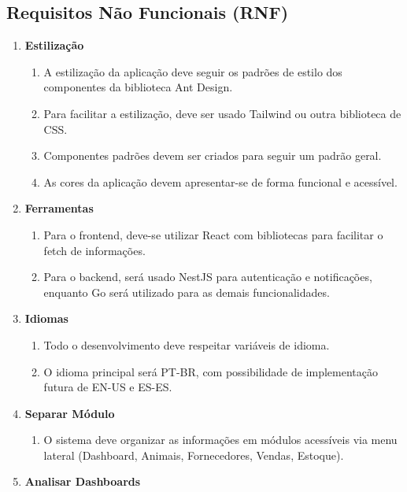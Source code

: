 \documentclass[12pt, a4paper]{article}
\begin{document}
\begin{spacing}{1.5}
\subsection{Requisitos Não Funcionais (RNF)}
\begin{spacing}{1.5}
\begin{enumerate}[label=RNF0\arabic{*}.]
    \item \textbf{Estilização}
    \begin{enumerate}[label=RNF01.0\arabic{*}]
        \item A estilização da aplicação deve seguir os padrões de estilo dos componentes da biblioteca Ant Design.
        \item Para facilitar a estilização, deve ser usado Tailwind ou outra biblioteca de CSS.
        \item Componentes padrões devem ser criados para seguir um padrão geral.
        \item As cores da aplicação devem apresentar-se de forma funcional e acessível.
    \end{enumerate}
    \item \textbf{Ferramentas}
    \begin{enumerate}[label=RNF02.0\arabic{*}]
        \item Para o frontend, deve-se utilizar React com bibliotecas para facilitar o fetch de informações.
        \item Para o backend, será usado NestJS para autenticação e notificações, enquanto Go será utilizado para as demais funcionalidades.
    \end{enumerate}
    \item \textbf{Idiomas}
    \begin{enumerate}[label=RNF03.0\arabic{*}]
        \item Todo o desenvolvimento deve respeitar variáveis de idioma.
        \item O idioma principal será PT-BR, com possibilidade de implementação futura de EN-US e ES-ES.
    \end{enumerate}
    \item \textbf{Separar Módulo}
    \begin{enumerate}[label=RF04.0\arabic{*}]
        \item O sistema deve organizar as informações em módulos acessíveis via menu lateral (Dashboard, Animais, Fornecedores, Vendas, Estoque).
    \end{enumerate}
    \item \textbf{Analisar Dashboards}

\end{enumerate}
\end{spacing}
\end{spacing}
\end{document}
